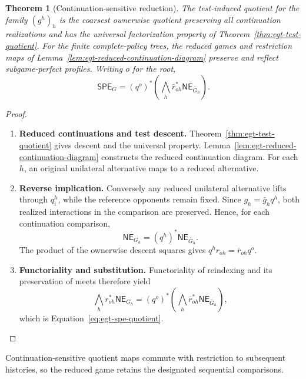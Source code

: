 \documentclass[11pt,a4paper]{article}
\numberwithin{equation}{section}
\newtheorem{theorem}{Theorem}[section]
\theoremstyle{definition}
\theoremstyle{remark}
\theoremstyle{plain}
\begin{document}
\begin{theorem}[Continuation-sensitive reduction]
\label{thm:egt-continuation-quotient}
The test-induced quotient for the family $(g^h)_h$ is the coarsest
ownerwise quotient preserving all continuation realizations and has the
universal factorization property of Theorem~\ref{thm:egt-test-quotient}.
For the finite complete-policy trees, the reduced games and restriction maps
of Lemma~\ref{lem:egt-reduced-continuation-diagram} preserve and reflect
subgame-perfect profiles. Writing $o$ for the root,
\begin{equation}
\label{eq:egt-spe-quotient}
 \mathsf{SPE}_G
 =(q^o)^*\left(\bigwedge_h
      \bar r_{oh}^*\mathsf{NE}_{\bar G_h}\right).
\end{equation}
\end{theorem}
\begin{proof}
\leavevmode
\begin{enumerate}[label=\textup{(\arabic*)},leftmargin=*,itemsep=4pt,topsep=3pt]
  \item \textbf{Reduced continuations and test descent.} Theorem~\ref{thm:egt-test-quotient} gives descent and the universal property. Lemma~\ref{lem:egt-reduced-continuation-diagram} constructs the reduced
continuation diagram. For each $h$, an original unilateral alternative maps
to a reduced alternative.
  \item \textbf{Reverse implication.} Conversely any reduced unilateral alternative
lifts through $q_i^h$, while the reference opponents remain fixed. Since
$g_h=\bar g_hq^h$, both realized interactions in the comparison are
preserved. Hence, for each continuation comparison,
\[
 \mathsf{NE}_{G_h}=(q^h)^*\mathsf{NE}_{\bar G_h}.
\]
The product of the ownerwise descent squares gives
$q^h r_{oh}=\bar r_{oh}q^o$.
  \item \textbf{Functoriality and substitution.} Functoriality of reindexing and its preservation
of meets therefore yield
\[
 \bigwedge_h r_{oh}^*\mathsf{NE}_{G_h}
 =(q^o)^*\left(\bigwedge_h
    \bar r_{oh}^*\mathsf{NE}_{\bar G_h}\right),
\]
which is Equation~\eqref{eq:egt-spe-quotient}.
\end{enumerate}
\end{proof}

\noindent Continuation-sensitive quotient maps commute with
restriction to subsequent histories, so the reduced game retains the
designated sequential comparisons.
\begin{center}
\end{center}
\end{document}
